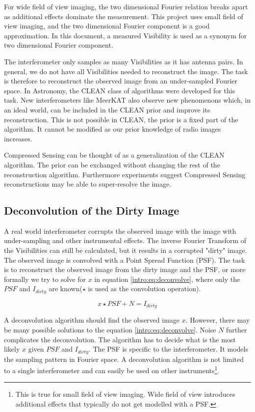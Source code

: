 For wide field of view imaging, the two dimensional Fourier relation breaks apart as additional effects dominate the measurement. This project uses small field of view imaging, and the two dimensional Fourier component is a good approximation. In this document, a measured Visibility is used as a synonym for two dimensional Fourier component.

The interferometer only samples as many Visibilities as it has antenna pairs. In general, we do not have all Visibilities needed to reconstruct the image. The task is therefore to reconstruct the observed image from an under-sampled Fourier space. In Astronomy, the CLEAN class of algorithms\cite{hogbom1974aperture}\cite{schwab1984relaxing}\cite{rich2008multi}\cite{rau2011multi} were developed for this task. New interferometers like MeerKAT also observe new phenomenons which, in an ideal world, can be included in the CLEAN prior and improve its reconstruction. This is not possible in CLEAN, the prior is a fixed part of the algorithm. It cannot be modified as our prior knowledge of radio images increases.

Compressed Sensing can be thought of as a generalization of the CLEAN algorithm. The prior can be exchanged without changing the rest of the reconstruction algorithm. Furthermore experiments suggest Compressed Sensing reconstructions may be able to super-resolve the image\cite{girard2015sparse}.


\subsection{Deconvolution of the Dirty Image}
A real world interferometer corrupts the observed image with the image with under-sampling and other instrumental effects. The inverse Fourier Transform of the Visibilities can still be calculated, but it results in a corrupted "dirty" image. The observed image is convolved with a Point Spread Function (PSF). The task is to reconstruct the observed image from the dirty image and the PSF, or more formally we try to solve for $x$ in equation \eqref{intro:eq:deconvolve}, where only the $PSF$ and $I_{dirty}$ are known($\star$ is used as the convolution operation).

\begin{equation}\label{intro:eq:deconvolve}
x \star  PSF + N = I_{dirty} 
\end{equation}

A deconvolution algorithm should find the observed image $x$. However, there may be many possible solutions to the equation \eqref{intro:eq:deconvolve}. Noise $N$ further complicates the deconvolution. The algorithm has to decide what is the most likely $x$ given $PSF$ and $I_{dirty}$. The PSF is specific to the interferometer. It models the sampling pattern in Fourier space. A deconvolution algorithm is not limited to a single interferometer and can easily be used on other instruments\footnote{This is true for small field of view imaging. Wide field of view introduces additional effects that typically do not get modelled with a PSF.}.

